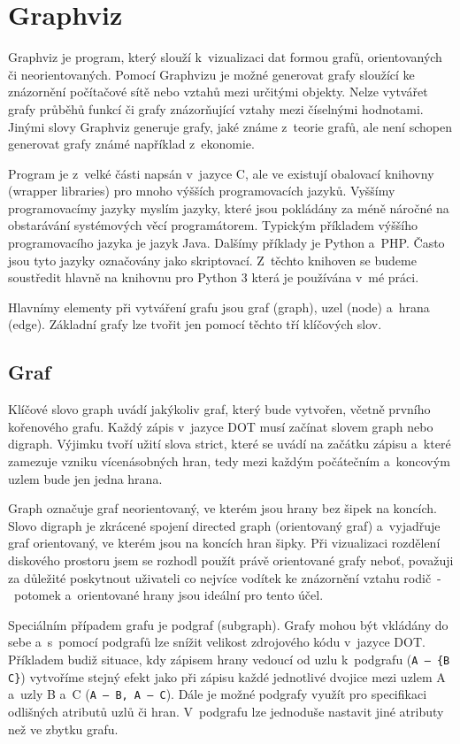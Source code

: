 \documentclass[color,table,oneside,nolot,nolof]{fithesis}
\begin{document}
\section{Graphviz}
	Graphviz je program, který slouží k~vizualizaci dat formou grafů, orientovaných či neorientovaných\cite{graphviz}. Pomocí Graphvizu je možné generovat grafy sloužící ke znázornění počítačové sítě nebo
	vztahů mezi určitými objekty. Nelze vytvářet grafy průběhů funkcí či grafy znázorňující vztahy mezi číselnými hodnotami. Jinými slovy Graphviz generuje grafy, jaké známe z~teorie grafů,
	ale není schopen generovat grafy známé například z~ekonomie.

	Program je z~velké části napsán v~jazyce C, ale ve existují obalovací knihovny (wrapper libraries) pro mnoho výšších programovacích jazyků. Vyššímy 
	programovacímy jazyky myslím jazyky, které jsou pokládány za méně náročné na obstarávání systémových věcí programátorem. Typickým příkladem výššího 
	programovacího jazyka je jazyk Java. Dalšímy příklady je Python a~PHP. Často jsou tyto jazyky označovány jako skriptovací. 
	Z~těchto knihoven se budeme soustředit hlavně na knihovnu pro Python 3 která je používána v~mé práci.

	Hlavnímy elementy při vytváření grafu jsou graf (graph), uzel (node) a~hrana (edge). Základní grafy lze tvořit jen pomocí těchto tří klíčových slov.

\subsection{Graf}
	Klíčové slovo graph uvádí jakýkoliv graf, který bude vytvořen, včetně prvního kořenového grafu. Každý zápis v~jazyce DOT musí začínat slovem graph nebo digraph. Výjimku tvoří užití slova
	strict, které se uvádí na začátku zápisu a~které zamezuje vzniku vícenásobných hran, tedy mezi každým počátečním a~koncovým uzlem bude jen jedna hrana. 

	Graph označuje graf neorientovaný, ve kterém jsou hrany bez šipek na koncích. Slovo digraph je zkrácené spojení directed graph (orientovaný
	graf) a~vyjadřuje graf orientovaný, ve kterém jsou na koncích hran šipky. Při vizualizaci rozdělení diskového prostoru jsem se rozhodl použít právě orientované grafy neboť, považuji za 
	důležité poskytnout uživateli co nejvíce vodítek ke znázornění vztahu rodič~-~potomek a~orientované hrany jsou ideální pro tento účel. 

	Speciálním případem grafu je podgraf (subgraph). Grafy mohou být vkládány do sebe a~s~pomocí podgrafů lze snížit velikost zdrojového kódu v~jazyce DOT. Příkladem budiž situace, kdy zápisem
	hrany vedoucí od uzlu k~podgrafu (\texttt{A~--~\{B C\}}) vytvoříme stejný efekt jako při zápisu každé jednotlivé dvojice mezi uzlem A a~uzly B a~C (\texttt{A~--~B, A~--~C}). Dále je možné podgrafy využít
	pro specifikaci odlišných atributů uzlů či hran. V~podgrafu lze jednoduše nastavit jiné atributy než ve zbytku grafu.
\end{document}

